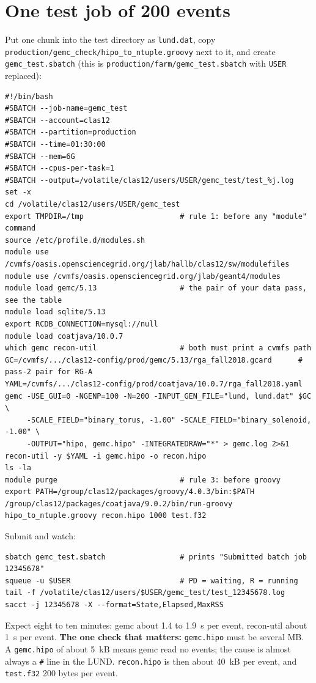 \documentclass[11pt]{article}
\begin{document}
\section{One test job of 200 events}
Put one chunk into the test directory as \texttt{lund.dat}, copy
\texttt{production/gemc\_check/hipo\_to\_ntuple.groovy} next to it, and create
\texttt{gemc\_test.sbatch} (this is \texttt{production/farm/gemc\_test.sbatch} with \texttt{USER}
replaced):
\begin{lstlisting}
#!/bin/bash
#SBATCH --job-name=gemc_test
#SBATCH --account=clas12
#SBATCH --partition=production
#SBATCH --time=01:30:00
#SBATCH --mem=6G
#SBATCH --cpus-per-task=1
#SBATCH --output=/volatile/clas12/users/USER/gemc_test/test_%j.log
set -x
cd /volatile/clas12/users/USER/gemc_test
export TMPDIR=/tmp                      # rule 1: before any "module" command
source /etc/profile.d/modules.sh
module use /cvmfs/oasis.opensciencegrid.org/jlab/hallb/clas12/sw/modulefiles
module use /cvmfs/oasis.opensciencegrid.org/jlab/geant4/modules
module load gemc/5.13                   # the pair of your data pass, see the table
module load sqlite/5.13
export RCDB_CONNECTION=mysql://null
module load coatjava/10.0.7
which gemc recon-util                   # both must print a cvmfs path
GC=/cvmfs/.../clas12-config/prod/gemc/5.13/rga_fall2018.gcard      # pass-2 pair for RG-A
YAML=/cvmfs/.../clas12-config/prod/coatjava/10.0.7/rga_fall2018.yaml
gemc -USE_GUI=0 -NGENP=100 -N=200 -INPUT_GEN_FILE="lund, lund.dat" $GC \
     -SCALE_FIELD="binary_torus, -1.00" -SCALE_FIELD="binary_solenoid, -1.00" \
     -OUTPUT="hipo, gemc.hipo" -INTEGRATEDRAW="*" > gemc.log 2>&1
recon-util -y $YAML -i gemc.hipo -o recon.hipo
ls -la
module purge                            # rule 3: before groovy
export PATH=/group/clas12/packages/groovy/4.0.3/bin:$PATH
/group/clas12/packages/coatjava/9.0.2/bin/run-groovy hipo_to_ntuple.groovy recon.hipo 1000 test.f32
\end{lstlisting}
Submit and watch:
\begin{lstlisting}
sbatch gemc_test.sbatch                 # prints "Submitted batch job 12345678"
squeue -u $USER                         # PD = waiting, R = running
tail -f /volatile/clas12/users/$USER/gemc_test/test_12345678.log
sacct -j 12345678 -X --format=State,Elapsed,MaxRSS
\end{lstlisting}
Expect eight to ten minutes: gemc about 1.4 to 1.9~s per event, recon-util about 1~s per event.
\textbf{The one check that matters:} \texttt{gemc.hipo} must be several MB. A \texttt{gemc.hipo} of
about 5~kB means gemc read no events; the cause is almost always a \texttt{\#} line in the LUND.
\texttt{recon.hipo} is then about 40~kB per event, and \texttt{test.f32} 200 bytes per event.
\end{document}
